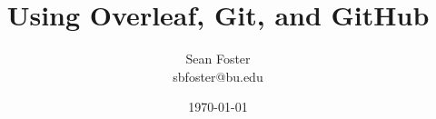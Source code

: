 \documentclass{article}
\begin{document}
\title{Using Overleaf, Git, and GitHub}
\author{Sean Foster \\ sbfoster@bu.edu}
\date{\today}
\maketitle

\begin{abstract}

   

\end{abstract}

\tableofcontents




\clearpage
\end{document}
